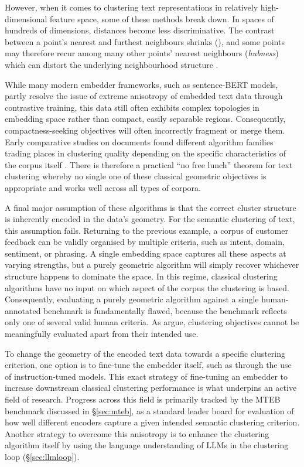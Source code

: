 \documentclass[11pt,a4paper,oneside]{report}
\begin{document}
However, when it comes to clustering text representations in relatively high-dimensional feature space, some of these methods break down. In spaces of hundreds of dimensions, distances become less discriminative. The contrast between a point's nearest and furthest neighbours shrinks (\citealp{beyer1999nearest,aggarwal2001surprising}), and some points may therefore recur among many other points' nearest neighbours (\emph{hubness}) which can distort the underlying neighbourhood structure \citep{radovanovic2010hubs}.

While many modern embedder frameworks, such as sentence-BERT models, partly resolve the issue of extreme anisotropy of embedded text data through contrastive training, this data still often exhibits complex topologies in embedding space rather than compact, easily separable regions. Consequently, compactness-seeking objectives will often incorrectly fragment or merge them. Early comparative studies on documents found different algorithm families trading places in clustering quality depending on the specific characteristics of the corpus itself \citep{steinbach2000comparison}. There is therefore a practical ``no free lunch'' theorem for text clustering whereby no single one of these classical geometric objectives is appropriate and works well across all types of corpora.

A final major assumption of these algorithms is that the correct cluster structure is inherently encoded in the data's geometry. For the semantic clustering of text, this assumption fails. Returning to the previous example, a corpus of customer feedback can be validly organised by multiple criteria, such as intent, domain, sentiment, or phrasing. A single embedding space captures all these aspects at varying strengths, but a purely geometric algorithm will simply recover whichever structure happens to dominate the space. In this regime, classical clustering algorithms have no input on which aspect of the corpus the clustering is based. Consequently, evaluating a purely geometric algorithm against a single human-annotated benchmark is fundamentally flawed, because the benchmark reflects only one of several valid human criteria. As \citet{vonluxburg2012science} argue, clustering objectives cannot be meaningfully evaluated apart from their intended use.

To change the geometry of the encoded text data towards a specific clustering criterion, one option is to fine-tune the embedder itself, such as through the use of instruction-tuned models. This exact strategy of fine-tuning an embedder to increase downstream classical clustering performance is what underpins an active field of research. Progress across this field is primarily tracked by the MTEB benchmark discussed in \S\ref{sec:mteb}, as a standard leader board for evaluation of how well different encoders capture a given intended semantic clustering criterion. Another strategy to overcome this anisotropy is to enhance the clustering algorithm itself by using the language understanding of LLMs in the clustering loop (\S\ref{sec:llmloop}).
\end{document}
